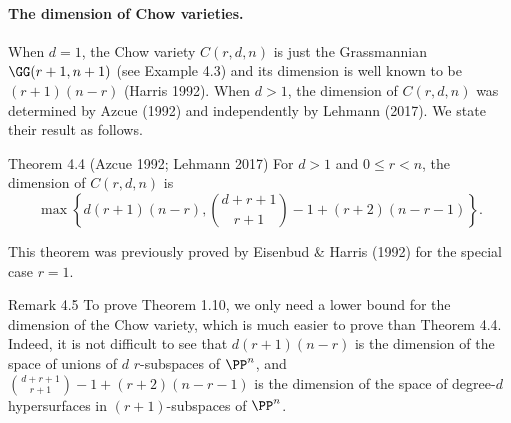 \paragraph{The dimension of Chow varieties.}
When $d=1$, the Chow variety $C(r,d,n)$ is just the Grassmannian $\GG(r+1,n+1)$ (see Example 4.3) and its dimension is well known to be $(r+1)(n-r)$ (Harris 1992). When $d>1$, the dimension of $C(r,d,n)$ was determined by Azcue (1992) and independently by Lehmann (2017). We state their result as follows.
\begin{result}{Theorem 4.4 (Azcue 1992; Lehmann 2017)}
For $d>1$ and $0\le r<n$, the dimension of $C(r,d,n)$ is
\[\max\left\{d(r+1)(n-r),\binom{d+r+1}{r+1}-1+(r+2)(n-r-1)\right\}.\]
\end{result}
This theorem was previously proved by Eisenbud \& Harris (1992) for the special case $r=1$.
\begin{result}{Remark 4.5}
To prove Theorem 1.10, we only need a lower bound for the dimension of the Chow variety, which is much easier to prove than Theorem 4.4. Indeed, it is not difficult to see that $d(r+1)(n-r)$ is the dimension of the space of unions of $d$ $r$-subspaces of $\PP^n$, and $\binom{d+r+1}{r+1}-1+(r+2)(n-r-1)$ is the dimension of the space of degree-$d$ hypersurfaces in $(r+1)$-subspaces of $\PP^n$.
\end{result}
